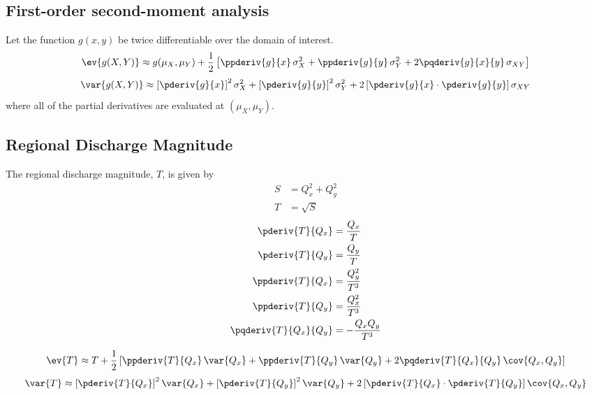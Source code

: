 \subsection{First-order second-moment analysis}
Let the function $g(x,y)$ be twice differentiable over the domain of interest.
%
\begin{equation} \label{8.1}
    \ev{g(X,Y)} \approx g(\mu_X,\mu_Y) + \frac{1}{2} \left[
        \ppderiv{g}{x} \, \sigma_X^2 +
        \ppderiv{g}{y} \, \sigma_Y^2 +
        2 \pqderiv{g}{x}{y} \, \sigma_{XY} \right]
\end{equation}
%
\begin{equation} \label{8.2}
    \var{g(X,Y)} \approx
        \left[ \pderiv{g}{x} \right]^2 \sigma_X^2 +
        \left[ \pderiv{g}{y} \right]^2 \sigma_Y^2 +
        2 \left[ \pderiv{g}{x} \cdot \pderiv{g}{y} \right] \sigma_{XY}
\end{equation}
%
where all of the partial derivatives are evaluated at $(\mu_X,\mu_Y)$.


\newpage
\subsection{Regional Discharge Magnitude}
The regional discharge magnitude, $T$, is given by
%
\begin{align}
    S &= Q_x^2 + Q_y^2 \label{2.13}\\
    T &= \sqrt{S} \label{2.14}
\end{align}
%
\begin{align}
    \pderiv{T}{Q_x} &= \frac{Q_x}{T} \label{2.15}\\
    \pderiv{T}{Q_y} &= \frac{Q_y}{T} \label{2.16}\\
    \ppderiv{T}{Q_x} &= \frac{Q_y^2}{T^3} \label{2.17}\\
    \ppderiv{T}{Q_y} &= \frac{Q_x^2}{T^3} \label{2.18}\\
    \pqderiv{T}{Q_x}{Q_y} &= - \frac{Q_x Q_y}{T^3} \label{2.19}
\end{align}

\begin{equation}\label{2.20}
    \ev{T} \approx T + \frac{1}{2} \left[
        \ppderiv{T}{Q_x} \, \var{Q_x} +
        \ppderiv{T}{Q_y} \, \var{Q_y} +
        2 \pqderiv{T}{Q_x}{Q_y} \, \cov{Q_x,Q_y} \right]
\end{equation}
%
\begin{equation}\label{2.21}
    \var{T} \approx
        \left[ \pderiv{T}{Q_x} \right]^2 \var{Q_x} +
        \left[ \pderiv{T}{Q_y} \right]^2 \var{Q_y} +
        2 \left[ \pderiv{T}{Q_x} \cdot \pderiv{T}{Q_y} \right] \cov{Q_x,Q_y}
\end{equation}

